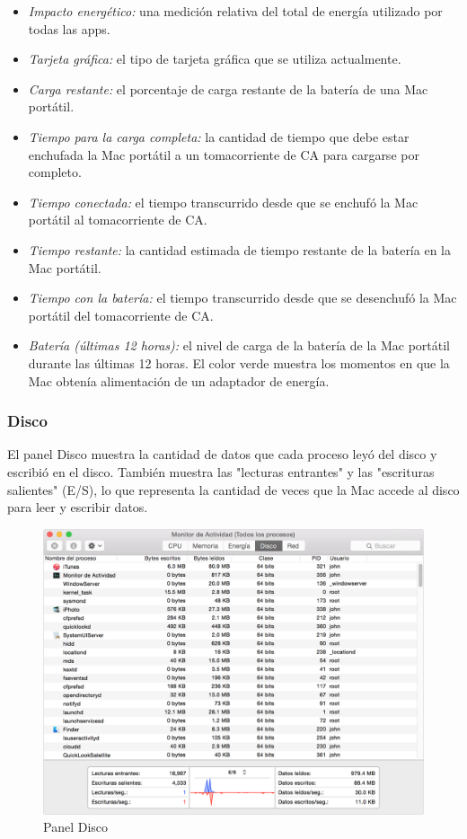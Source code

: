 \documentclass[a4paper,11pt]{article}
\begin{document}
\begin{itemize}
  \item \textit{Impacto energético:} una medición relativa del total de energía utilizado por todas las apps.
  \item \textit{Tarjeta gráfica:} el tipo de tarjeta gráfica que se utiliza actualmente.
  \item \textit{Carga restante:} el porcentaje de carga restante de la batería de una Mac portátil.
  \item \textit{Tiempo para la carga completa:} la cantidad de tiempo que debe estar enchufada la Mac portátil a un tomacorriente de CA para cargarse por completo.
  \item \textit{Tiempo conectada:} el tiempo transcurrido desde que se enchufó la Mac portátil al tomacorriente de CA.
  \item \textit{Tiempo restante:} la cantidad estimada de tiempo restante de la batería en la Mac portátil.
  \item \textit{Tiempo con la batería:} el tiempo transcurrido desde que se desenchufó la Mac portátil del tomacorriente de CA.
  \item \textit{Batería (últimas 12 horas):} el nivel de carga de la batería de la Mac portátil durante las últimas 12 horas. El color verde muestra los momentos en que la Mac obtenía alimentación de un adaptador de energía.
\end{itemize}

\subsubsection{Disco}

El panel Disco muestra la cantidad de datos que cada proceso leyó del disco y escribió en el disco. También muestra las "lecturas entrantes" y las "escrituras salientes" (E/S), lo que representa la cantidad de veces que la Mac accede al disco para leer y escribir datos.

\begin{figure}[H]
  \centering
  \includegraphics[width=1\textwidth]{04macActivityMonitorDisk}
  \caption{Panel Disco}
  \label{fig:macActivityMonitorDisk}
\end{figure}
\end{document}
